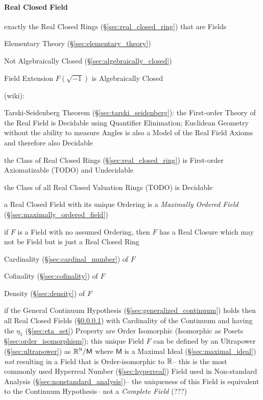 \paragraph{Real Closed Field}\label{sec:real_closed}\hfill

exactly the Real Closed Rings (\S\ref{sec:real_closed_ring}) that are Fields

Elementary Theory (\S\ref{sec:elementary_theory})

Not Algebraically Closed (\S\ref{sec:algebraically_closed})

Field Extension $F(\sqrt{-1})$ is Algebraically Closed

(wiki):

Tarski-Seidenberg Theorem (\S\ref{sec:tarski_seidenberg}): the First-order
Theory of the Real Field is Decidable using Quantifier Elinimation; Euclidean
Geometry without the ability to measure Angles is also a Model of the Real
Field Axioms and therefore also Decidable

the Class of Real Closed Rings (\S\ref{sec:real_closed_ring}) is First-order
Axiomatizable (TODO) and Undecidable

the Class of all Real Closed Valuation Rings (TODO) is Decidable

a Real Closed Field with its unique Ordering is a \emph{Maximally Ordered
  Field} (\S\ref{sec:maximally_ordered_field})

if $F$ is a Field with no assumed Ordering, then $F$ has a Real Closure which
may not be Field but is just a Real Closed Ring

Cardinality (\S\ref{sec:cardinal_number}) of $F$

Cofinality (\S\ref{sec:cofinality}) of $F$

Density (\S\ref{sec:density}) of $F$

if the General Continuum Hypothesis (\S\ref{sec:generalized_continuum}) holds
then all Real Closed Fields (\S\ref{sec:real_closed}) with Cardinality of the
Continuum and having the $\eta_1$ (\S\ref{sec:eta_set}) Property are Order
Isomorphic (Isomorphic as Posets \S\ref{sec:order_isomorphism});
this unique Field $F$ can be defined by an Ultrapower (\S\ref{sec:ultrapower})
as $\mathbb{R}^{\mathbb{N}} / \mathsf{M}$ where $\mathsf{M}$ is a Maximal Ideal
(\S\ref{sec:maximal_ideal}) \emph{not} resulting in a Field that is
Order-isomorphic to $\mathbb{R}$-- this is the most commonly used Hyperreal Number
(\S\ref{sec:hyperreal}) Field used in Non-standard Analysis
(\S\ref{sec:nonstandard_analysis})-- the uniqueness of this Field is equivalent
to the Continuum Hypothesis-- not a \emph{Complete Field} (???) %

